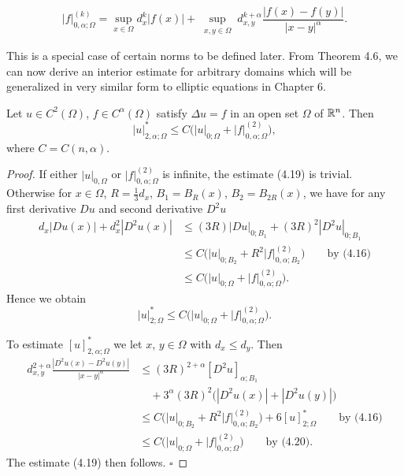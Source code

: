 \begin{equation}\tag{4.18}
|f|^{(k)}_{0,\alpha;\Omega}=\sup_{x\in\Omega} d_x^k|f(x)|+\sup_{\substack{x,y\in\Omega}} d_{x,y}^{k+\alpha}\frac{|f(x)-f(y)|}{|x-y|^\alpha}.
\end{equation}

\noindent
This is a special case of certain norms to be defined later.
From Theorem 4.6, we can now derive an interior estimate for arbitrary domains
which will be generalized in very similar form to elliptic equations in Chapter 6.




\begin{theorem}\label{gt:thm-poisson-interior-weighted}
Let $u \in C^2(\Omega)$, $f \in C^\alpha(\Omega)$ satisfy $\Delta u = f$ in an open set $\Omega$ of $\mathbb{R}^n$. Then
\begin{equation}
|u|_{2,\alpha;\Omega}^* \le C\bigl(|u|_{0;\Omega}+|f|_{0,\alpha;\Omega}^{(2)}\bigr),
\tag{4.19}
\end{equation}
where $C=C(n,\alpha)$.
\end{theorem}

\begin{proof}
If either $|u|_{0,\Omega}$ or $|f|_{0,\alpha;\Omega}^{(2)}$ is infinite, the estimate (4.19) is trivial. Otherwise for $x \in \Omega$, $R=\frac{1}{3}d_x$, $B_1=B_R(x)$, $B_2=B_{2R}(x)$, we have for any first derivative $Du$ and second derivative $D^2u$
\begin{align*}
d_x|Du(x)| + d_x^2|D^2u(x)| &\le (3R)|Du|_{0;B_1} + (3R)^2|D^2u|_{0;B_1}\\
&\le C\bigl(|u|_{0;B_2}+R^2|f|_{0,\alpha;B_2}^{(2)}\bigr) \qquad \text{by (4.16)}\\
&\le C\bigl(|u|_{0;\Omega}+|f|_{0,\alpha;\Omega}^{(2)}\bigr).
\end{align*}
Hence we obtain
\begin{equation}
|u|_{2;\Omega}^* \le C\bigl(|u|_{0;\Omega}+|f|_{0,\alpha;\Omega}^{(2)}\bigr).
\tag{4.20}
\end{equation}

To estimate $[u]^*_{2,\alpha;\Omega}$ we let $x$, $y \in \Omega$ with $d_x \le d_y$. Then
\begin{align*}
d_{x,y}^{2+\alpha}\frac{|D^2u(x)-D^2u(y)|}{|x-y|^\alpha}
&\le (3R)^{2+\alpha}[D^2u]_{\alpha;B_1}\\
&\quad + 3^\alpha(3R)^2\bigl(|D^2u(x)|+|D^2u(y)|\bigr)\\
&\le C\bigl(|u|_{0;B_2}+R^2|f|_{0,\alpha;B_2}^{(2)}\bigr) + 6[u]^*_{2;\Omega} \qquad \text{by (4.16)}\\
&\le C\bigl(|u|_{0;\Omega}+|f|_{0,\alpha;\Omega}^{(2)}\bigr) \qquad \text{by (4.20)}.
\end{align*}
The estimate (4.19) then follows. $\square$
\end{proof}

